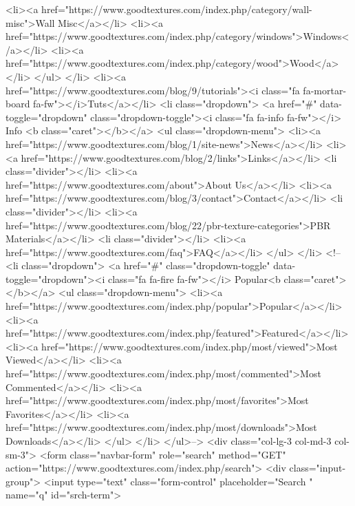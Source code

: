                                                     <li><a href="https://www.goodtextures.com/index.php/category/wall-misc">Wall Misc</a></li>
                                                    <li><a href="https://www.goodtextures.com/index.php/category/windows">Windows</a></li>
                                                    <li><a href="https://www.goodtextures.com/index.php/category/wood">Wood</a></li>
                                            </ul>
                </li>
				<li><a href="https://www.goodtextures.com/blog/9/tutorials"><i class="fa fa-mortar-board fa-fw"></i>Tuts</a></li>
				      <li class="dropdown">
                        <a href="#" data-toggle="dropdown" class="dropdown-toggle"><i class="fa fa-info fa-fw"></i>  Info <b class="caret"></b></a>
                        <ul class="dropdown-menu">
                            <li><a href="https://www.goodtextures.com/blog/1/site-news">News</a></li>
                            <li><a href="https://www.goodtextures.com/blog/2/links">Links</a></li>
                            <li class="divider"></li>
							<li><a href="https://www.goodtextures.com/about">About Us</a></li>
                            <li><a href="https://www.goodtextures.com/blog/3/contact">Contact</a></li>
							<li class="divider"></li>
                            <li><a href="https://www.goodtextures.com/blog/22/pbr-texture-categories">PBR Materials</a></li>
							<li class="divider"></li>
							<li><a href="https://www.goodtextures.com/faq">FAQ</a></li>
                        </ul>
                    </li>
                <!--<li class="dropdown">
                    <a href="#" class="dropdown-toggle" data-toggle="dropdown"><i class="fa fa-fire fa-fw"></i> Popular<b class="caret"></b></a>
                    <ul class="dropdown-menu">
                        <li><a href="https://www.goodtextures.com/index.php/popular">Popular</a></li>
                        <li><a href="https://www.goodtextures.com/index.php/featured">Featured</a></li>
                        <li><a href="https://www.goodtextures.com/index.php/most/viewed">Most Viewed</a></li>
                        <li><a href="https://www.goodtextures.com/index.php/most/commented">Most Commented</a></li>
                        <li><a href="https://www.goodtextures.com/index.php/most/favorites">Most Favorites</a></li>
                        <li><a href="https://www.goodtextures.com/index.php/most/downloads">Most Downloads</a></li>
                    </ul>
                </li>
            </ul>-->
            <div class="col-lg-3 col-md-3 col-sm-3">
                <form class="navbar-form" role="search" method="GET" action="https://www.goodtextures.com/index.php/search">
                    <div class="input-group">
                        <input type="text" class="form-control" placeholder="Search " name="q" id="srch-term">

